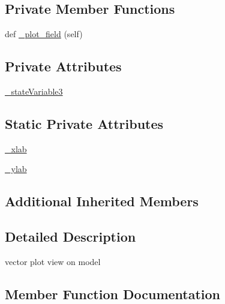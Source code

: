 \subsection*{Private Member Functions}
\begin{DoxyCompactItemize}
\item 
def \hyperlink{class_mu_mo_t_1_1_mu_mo_tvector_view_a50d59419298116f738a98c864afb9d89}{\+\_\+plot\+\_\+field} (self)
\end{DoxyCompactItemize}
\subsection*{Private Attributes}
\begin{DoxyCompactItemize}
\item 
\hyperlink{class_mu_mo_t_1_1_mu_mo_tvector_view_ad2f8dc44173a16468bd9d3ab335f9b27}{\+\_\+state\+Variable3}
\end{DoxyCompactItemize}
\subsection*{Static Private Attributes}
\begin{DoxyCompactItemize}
\item 
\hyperlink{class_mu_mo_t_1_1_mu_mo_tvector_view_a865b2109ba10d874e84d4a354873b121}{\+\_\+xlab}
\item 
\hyperlink{class_mu_mo_t_1_1_mu_mo_tvector_view_aac1a25a634d53e524573f67eb5f3a7b9}{\+\_\+ylab}
\end{DoxyCompactItemize}
\subsection*{Additional Inherited Members}


\subsection{Detailed Description}
vector plot view on model 

\subsection{Member Function Documentation}
\mbox{\label{class_mu_mo_t_1_1_mu_mo_tvector_view_a50d59419298116f738a98c864afb9d89}} 

